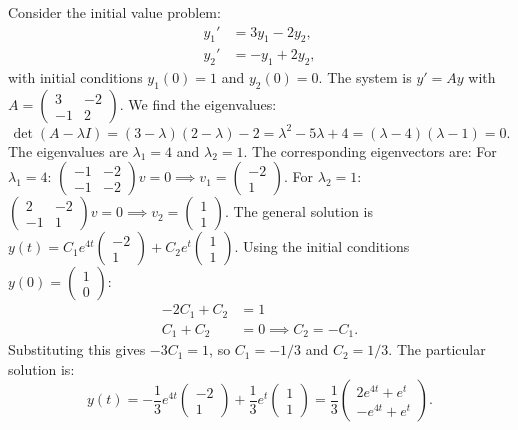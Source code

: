 \begin{example}
\label{ex:ode_ivp_system}
Consider the initial value problem:
\begin{align*}
    y_1' &= 3y_1 - 2y_2, \\
    y_2' &= -y_1 + 2y_2,
\end{align*}
with initial conditions $y_1(0) = 1$ and $y_2(0) = 0$.
The system is $y' = A y$ with $A = \begin{pmatrix} 3 & -2 \\ -1 & 2 \end{pmatrix}$. We find the eigenvalues:
\[\det(A - \lambda I) = (3-\lambda)(2-\lambda) - 2 = \lambda^2 - 5\lambda + 4 = (\lambda - 4)(\lambda - 1) = 0.\]
The eigenvalues are $\lambda_1 = 4$ and $\lambda_2 = 1$. The corresponding eigenvectors are:
For $\lambda_1 = 4$: $\begin{pmatrix} -1 & -2 \\ -1 & -2 \end{pmatrix} v = 0 \implies v_1 = \begin{pmatrix} -2 \\ 1 \end{pmatrix}$.
For $\lambda_2 = 1$: $\begin{pmatrix} 2 & -2 \\ -1 & 1 \end{pmatrix} v = 0 \implies v_2 = \begin{pmatrix} 1 \\ 1 \end{pmatrix}$.
The general solution is $y(t) = C_1 e^{4t} \begin{pmatrix} -2 \\ 1 \end{pmatrix} + C_2 e^{t} \begin{pmatrix} 1 \\ 1 \end{pmatrix}$.
Using the initial conditions $y(0) = \begin{pmatrix} 1 \\ 0 \end{pmatrix}$:
\begin{align*}
    -2C_1 + C_2 &= 1 \\
    C_1 + C_2 &= 0 \implies C_2 = -C_1.
\end{align*}
Substituting this gives $-3C_1 = 1$, so $C_1 = -1/3$ and $C_2 = 1/3$. The particular solution is:
\[y(t) = -\frac{1}{3} e^{4t} \begin{pmatrix} -2 \\ 1 \end{pmatrix} + \frac{1}{3} e^{t} \begin{pmatrix} 1 \\ 1 \end{pmatrix} = \frac{1}{3} \begin{pmatrix} 2e^{4t} + e^t \\ -e^{4t} + e^t \end{pmatrix}.\]
\end{example}

